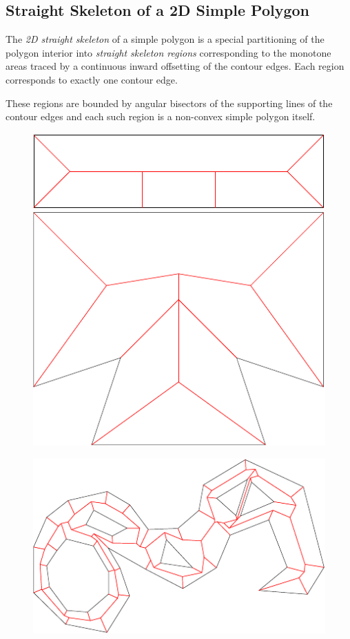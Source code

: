 \subsection{Straight Skeleton of a 2D Simple Polygon}
 
The {\em 2D straight skeleton} \cite{aaag-ntsp-95} of a simple polygon is a special
partitioning of the polygon interior into {\em straight skeleton
regions} corresponding to the monotone areas traced by a continuous
inward offsetting of the contour edges. Each region
corresponds to exactly one contour edge.

These regions are bounded by angular bisectors of the supporting lines
of the contour edges and each such region is a non-convex simple
polygon itself.

\begin{figure}[htbp]
\begin{ccTexOnly}
\begin{center}
\includegraphics{Straight_skeleton_2/fig2} %
\includegraphics{Straight_skeleton_2/fig3} %
\end{center}
\begin{center}
\includegraphics{Straight_skeleton_2/fig4} %

\end{center}
\end{ccTexOnly}
\end{figure}
